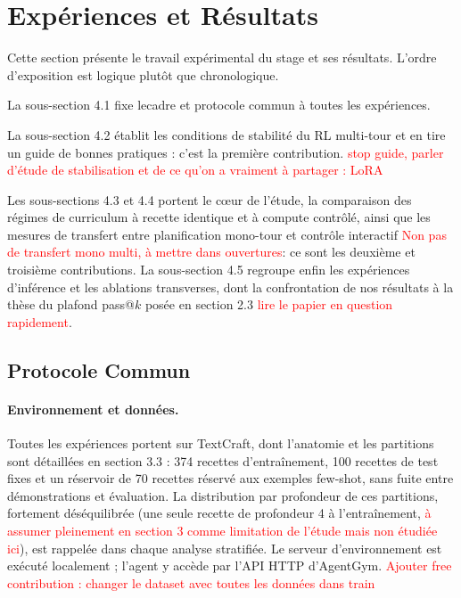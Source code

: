 \documentclass[11pt,a4paper]{article}
\begin{document}
\newpage
\section{Expériences et Résultats}

Cette section présente le travail expérimental du stage et ses résultats. L'ordre d'exposition est logique plutôt que chronologique. 

La sous-section 4.1 fixe lecadre et protocole commun à toutes les expériences.

La sous-section 4.2 établit les conditions de stabilité du RL multi-tour et en tire un guide de bonnes pratiques : c'est la première contribution. \textcolor{red}{stop guide, parler d'étude de stabilisation et de ce qu'on a vraiment à partager : LoRA}

Les sous-sections 4.3 et 4.4 portent le cœur de l'étude, la comparaison des régimes de curriculum à recette identique et à compute contrôlé, ainsi que les mesures de transfert entre planification mono-tour et contrôle interactif \textcolor{red}{Non pas de transfert mono multi, à mettre dans ouvertures}: ce sont les deuxième et troisième contributions. La sous-section 4.5 regroupe enfin les expériences d'inférence et les ablations transverses, dont la confrontation de nos résultats à la thèse du plafond pass@$k$ posée en section 2.3 \textcolor{red}{lire le papier en question rapidement}. 







\subsection{Protocole Commun}\label{subsec:protocole}

\paragraph{Environnement et données.} Toutes les expériences portent sur TextCraft, dont l'anatomie et les partitions sont détaillées en section 3.3 : 374 recettes d'entraînement, 100 recettes de test fixes et un réservoir de 70 recettes réservé aux exemples few-shot, sans fuite entre démonstrations et évaluation. La distribution par profondeur de ces partitions, fortement déséquilibrée (une seule recette de profondeur 4 à l'entraînement, \textcolor{red}{à assumer pleinement en section 3 comme limitation de l'étude mais non étudiée ici}), est rappelée dans chaque analyse stratifiée. Le serveur d'environnement est exécuté localement ; l'agent y accède par l'API HTTP d'AgentGym. \textcolor{red}{Ajouter free contribution : changer le dataset avec toutes les données dans train}
\end{document}
